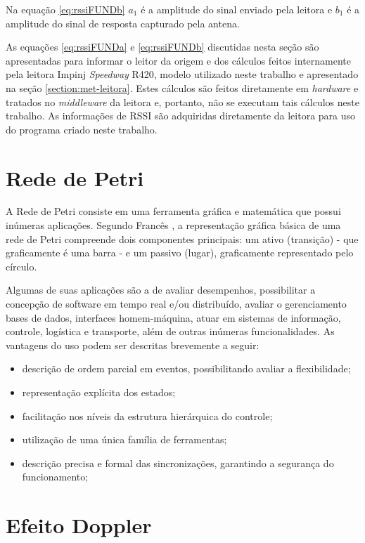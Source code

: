 Na equação \ref{eq:rssiFUNDb} $a_1$ é a amplitude do sinal enviado pela leitora e $b_1$ é a amplitude do sinal de resposta capturado pela antena.

As equações \ref{eq:rssiFUNDa} e \ref{eq:rssiFUNDb} discutidas nesta seção são apresentadas para informar o leitor da origem e dos cálculos feitos internamente pela leitora Impinj \textit{Speedway} R420, modelo utilizado neste trabalho e apresentado na seção \ref{section:met-leitora}. Estes cálculos são feitos diretamente em \textit{hardware} e tratados no \textit{middleware} da leitora e, portanto, não se executam tais cálculos neste trabalho. As informações de RSSI são adquiridas diretamente da leitora para uso do programa criado neste trabalho.
    
\section{Rede de Petri}
    
A Rede de Petri consiste em uma ferramenta gráfica e matemática que possui inúmeras aplicações. Segundo Francês \cite{Frances}, a representação gráfica básica de uma rede de Petri compreende dois componentes principais: um ativo (transição) - que graficamente é uma barra - e um passivo (lugar), graficamente representado pelo círculo. 

Algumas de suas aplicações são a de avaliar desempenhos, possibilitar a concepção de software em tempo real e/ou distribuído, avaliar o gerenciamento bases de dados, interfaces homem-máquina, atuar em sistemas de informação, controle, logística e transporte, além de outras inúmeras funcionalidades. As vantagens do uso podem ser descritas brevemente a seguir: \cite{Cardoso1997}

\begin{itemize}
    \item descrição de ordem parcial em eventos, possibilitando avaliar a flexibilidade;
    \item representação explícita dos estados;
    \item facilitação nos níveis da estrutura hierárquica do controle;
    \item utilização de uma única família de ferramentas; 
    \item descrição precisa e formal das sincronizações, garantindo a segurança do funcionamento;
\end{itemize}
    
\section{Efeito Doppler} \label{section:doppler_fund}

